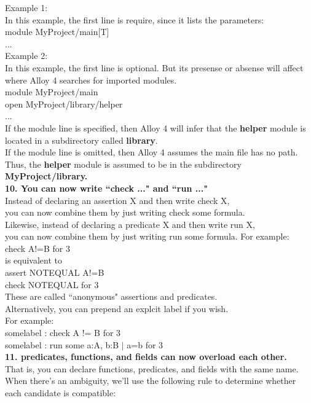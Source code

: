 \documentclass[a4paper,12pt]{extarticle}
\begin{document}
Example 1: \\
In this example, the first line is require, since it lists the parameters: \\
module MyProject/main[T]\\
... \\
Example 2: \\
In this example, the first line is optional. But its presense or absense will affect where Alloy 4 searches for imported modules. \\
module MyProject/main\\
open MyProject/library/helper\\
... \\
If the module line is specified, then Alloy 4 will infer that the \textbf{helper} module is located in a subdirectory called \textbf{library}. \\
If the module line is omitted, then Alloy 4 assumes the main file has no path. Thus, the \textbf{helper} module is assumed to be in the subdirectory \textbf{MyProject/library.} \\
\textbf{10. You can now write ``check {...}" and ``run {...}"} \\
Instead of declaring an assertion X and then write check X,\\
you can now combine them by just writing check {some formula}. \\
Likewise, instead of declaring a predicate X and then write run X,\\
you can now combine them by just writing run {some formula}. 
For example:\\
  check { A!=B } for 3\\
is equivalent to\\
  assert NOTEQUAL { A!=B }\\
  check NOTEQUAL for 3 \\
These are called ``anonymous" assertions and predicates.\\
Alternatively, you can prepend an explcit label if you wish.\\
For example: \\
somelabel : check { A != B } for 3 \\
somelabel : run { some a:A, b:B $|$ a=b } for 3  \\
\textbf{11. predicates, functions, and fields can now overload each other.} \\ 
That is, you can declare functions, predicates, and fields with the same name. When there's an ambiguity, we'll use the following rule to determine whether each candidate is compatible: \\
\end{document}
